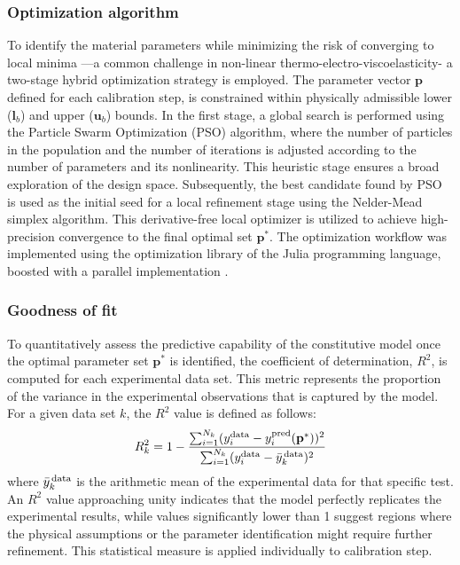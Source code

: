 \subsubsection{Optimization algorithm}

To identify the material parameters while minimizing the risk of converging to local minima —a common challenge in non-linear thermo-electro-viscoelasticity- a two-stage hybrid optimization strategy is employed. The parameter vector $\mathbf{p}$ defined for each calibration step, is constrained within physically admissible lower ($\mathbf{l}_b$) and upper ($\mathbf{u}_b$) bounds. In the first stage, a global search is performed using the Particle Swarm Optimization (PSO) algorithm, where the number of particles in the population and the number of iterations is adjusted according to the number of parameters and its nonlinearity. This heuristic stage ensures a broad exploration of the design space. Subsequently, the best candidate found by PSO is used as the initial seed for a local refinement stage using the Nelder-Mead simplex algorithm. This derivative-free local optimizer is utilized to achieve high-precision convergence to the final optimal set $\mathbf{p}^*$. The optimization workflow was implemented using the optimization library \cite{optimizationjl} of the Julia programming language, boosted with a parallel implementation \cite{utkarsh2024efficient}.


\subsubsection{Goodness of fit}

To quantitatively assess the predictive capability of the constitutive model once the optimal parameter set $\mathbf{p}^*$ is identified, the coefficient of determination, $R^2$, is computed for each experimental data set. This metric represents the proportion of the variance in the experimental observations that is captured by the model. For a given data set $k$, the $R^2$ value is defined as follows:
\begin{equation}
R^2_k = 1 - \frac{\sum_{i=1}^{N_k} (y_i^\text{data} - y_i^\text{pred}(\mathbf{p}^*))^2}{\sum_{i=1}^{N_k} (y_i^\text{data} - \bar{y}_k^\text{\,data})^2}
\end{equation}
where $\bar{y}_k^\text{\,data}$ is the arithmetic mean of the experimental data for that specific test. An $R^2$ value approaching unity indicates that the model perfectly replicates the experimental results, while values significantly lower than 1 suggest regions where the physical assumptions or the parameter identification might require further refinement. This statistical measure is applied individually to calibration step.


